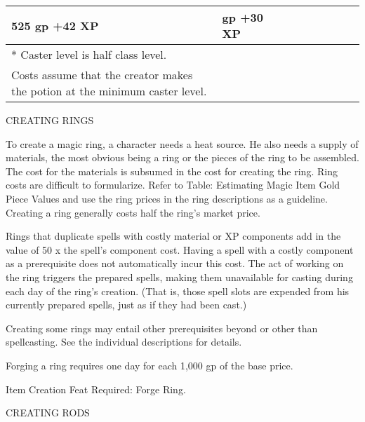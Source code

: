 \begin{longtable}{llllllllll}
{\begin{minipage}[t]{0.750in}
525 gp\linebreak
+42 XP\end{minipage}} & \multicolumn{1}{p{0.750in}|}{\begin{minipage}[t]{0.750in}\centering
375 gp\linebreak
+30 XP\end{minipage}}\\
\hline
\multicolumn{6}{p{1.199in}|}{\begin{minipage}[t]{1.199in}\centering
* Caster level is half class level.\end{minipage}}\\
\hline
\multicolumn{1}{|p{0.822in}|}{\begin{minipage}[t]{0.822in}\centering
Costs assume that the creator makes the potion at the minimum caster level.\end{minipage}}\\
\hline
\end{longtable}

\vspace{12pt}
{\large CREATING RINGS}

To create a magic ring, a character needs a heat source. He also needs a supply 
of materials, the most obvious being a ring or the pieces of the ring to be assembled. 
The cost for the materials is subsumed in the cost for creating the ring. Ring 
costs are difficult to formularize. Refer to Table: Estimating Magic Item Gold 
Piece Values and use the ring prices in the ring descriptions as a guideline. Creating 
a ring generally costs half the ring's market price.

Rings that duplicate spells with costly material or XP components add in the value 
of 50 x the spell's component cost. Having a spell with a costly component as a 
prerequisite does not automatically incur this cost. The act of working on the 
ring triggers the prepared spells, making them unavailable for casting during each 
day of the ring's creation. (That is, those spell slots are expended from his currently 
prepared spells, just as if they had been cast.)

Creating some rings may entail other prerequisites beyond or other than spellcasting. 
See the individual descriptions for details.

Forging a ring requires one day for each 1,000 gp of the base price.

Item Creation Feat Required: Forge Ring.

\vspace{12pt}
{\large CREATING RODS}

